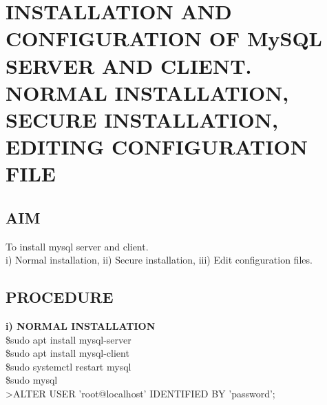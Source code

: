 \documentclass{article}
\begin{document}
\section{INSTALLATION AND CONFIGURATION OF MySQL SERVER AND CLIENT. NORMAL INSTALLATION, SECURE INSTALLATION, EDITING CONFIGURATION FILE}
\hrulefill
\vspace{1cm}
\begin{flushleft}

\subsection{AIM}

To install mysql server and client.\\i) Normal installation, ii) Secure installation, iii) Edit configuration files.

\subsection{PROCEDURE}
\textbf{{\normalsize i) NORMAL INSTALLATION}}\\
\vspace{0.1in}
\hspace{0.6in} \$sudo apt install mysql-server \\
\hspace{0.8in} \$sudo apt install mysql-client \\
\vspace{5pt}
\hspace{0.6in} \$sudo systemctl restart mysql\\
\hspace{0.6in} \$sudo mysql \\ \vspace{5pt}
\hspace{0.6in} \textgreater ALTER USER 'root@localhost' IDENTIFIED BY 'password';\\ \vspace{5pt}


\end{flushleft}
\end{document}
